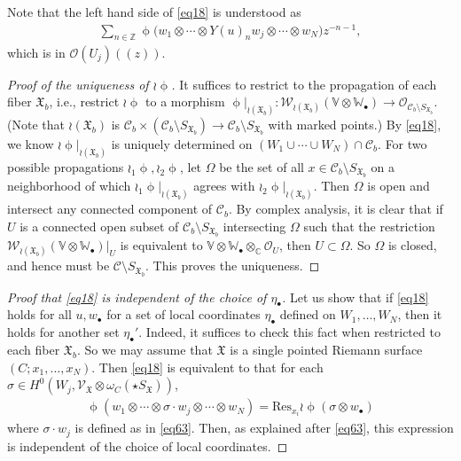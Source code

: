 \documentclass[12pt,a4paper,notitlepage]{article}
\theoremstyle{definition}
\theoremstyle{plain}
\newcommand{\fk}{\mathfrak}
\newcommand{\mc}{\mathcal}
\newcommand{\Res}{\mathrm{Res}}
\newcommand{\scr}{\mathscr}
\newcommand{\SX}{{S_{\fk X}}}
\newcommand{\blt}{\bullet}
\newcommand{\Vbb}{\mathbb V}
\newcommand{\Wbb}{\mathbb W}
\newcommand{\Cbb}{\mathbb C}
\newcommand{\Zbb}{\mathbb Z}
\newcommand{\SXb}{{S_{\fk X_b}}}
\numberwithin{equation}{section}
\begin{document}
Note that the left hand side of \eqref{eq18} is understood as
\begin{align*}
\sum_{n\in\Zbb} \upphi\big(w_1\otimes\cdots\otimes Y(u)_nw_j\otimes\cdots\otimes w_N\big)z^{-n-1},
\end{align*}
which is in $\scr O(U_j)((z))$. 

\begin{proof}[Proof of the uniqueness of $\wr\upphi$]
It suffices to restrict to the propagation of each fiber $\fk X_b$, i.e., restrict $\wr\upphi$ to a morphism $\upphi|_{\wr(\fk X_b)}:\scr W_{\wr(\fk X_b)}(\Vbb\otimes\Wbb_\blt)\rightarrow\scr O_{\mc C_b\setminus \SXb}$.	(Note that $\wr(\fk X_b)$ is $\mc C_b\times(\mc C_b\setminus\SXb)\rightarrow\mc C_b\setminus\SXb$ with marked points.) By \eqref{eq18}, we know $\wr\upphi|_{\wr(\fk X_b)}$ is uniquely determined on $(W_1\cup\cdots\cup W_N)\cap\mc C_b$. For two possible propagations $\wr_1\upphi,\wr_2\upphi$, let $\Omega$ be the set of all $x\in\mc C_b\setminus\SXb$ on a neighborhood of which $\wr_1\upphi|_{\wr(\fk X_b)}$ agrees with $\wr_2\upphi|_{\wr(\fk X_b)}$. Then $\Omega$ is open and  intersect any connected component of $\mc C_b$. By complex analysis, it is clear that if $U$ is a connected open subset of $\mc C_b\setminus\SXb$ intersecting $\Omega$ such that the restriction $\scr W_{\wr(\fk X_b)}(\Vbb\otimes\Wbb_\blt)|_U$ is equivalent to $\Vbb\otimes\Wbb_\blt\otimes_\Cbb\scr O_U$, then $U\subset\Omega$. So $\Omega$ is closed, and hence must be $\mc C\setminus\SXb$. This proves the uniqueness.
\end{proof}

\begin{proof}[Proof that \eqref{eq18} is independent of the choice of $\eta_\blt$]
Let us show that if \eqref{eq18} holds for all $u,w_\blt$ for a set of local coordinates $\eta_\blt$ defined on $W_1,\dots,W_N$, then it holds for another set $\eta_\blt'$. Indeed, it suffices to check this fact when restricted to each fiber $\fk X_b$. So we may assume that $\fk X$ is a single pointed Riemann surface $(C;x_1,\dots,x_N)$. Then \eqref{eq18} is equivalent to that for each $\sigma\in H^0(W_j,\scr V_{\fk X}\otimes\omega_C(\star\SX))$, 
\begin{align*}
\upphi (w_1\otimes\cdots\otimes\sigma\cdot w_j\otimes\cdots\otimes w_N)=\Res_{x_i}\wr\upphi(\sigma\otimes w_\blt)
\end{align*}
where $\sigma\cdot w_j$ is defined as in \eqref{eq63}. Then, as explained after \eqref{eq63}, this expression is independent of the choice of local coordinates.
\end{proof}
\end{document}
